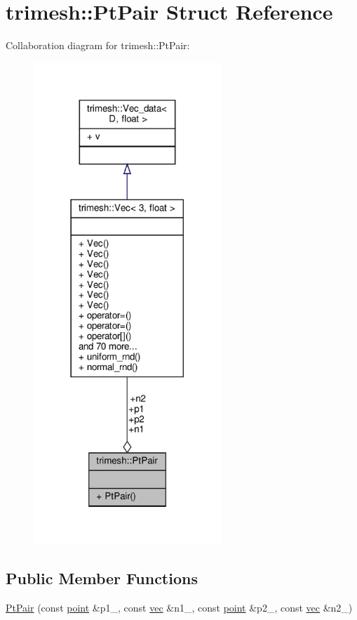 \hypertarget{structtrimesh_1_1PtPair}{}\section{trimesh\+:\+:Pt\+Pair Struct Reference}
\label{structtrimesh_1_1PtPair}


Collaboration diagram for trimesh\+:\+:Pt\+Pair\+:\nopagebreak
\begin{figure}[H]
\begin{center}
\leavevmode
\includegraphics[width=200pt]{da/d6d/structtrimesh_1_1PtPair__coll__graph}
\end{center}
\end{figure}
\subsection*{Public Member Functions}
\begin{DoxyCompactItemize}
\item 
\hyperlink{structtrimesh_1_1PtPair_aa30b38ab6c70ab6ce20b6a308a124a50}{Pt\+Pair} (const \hyperlink{namespacetrimesh_a325b99fd6454b22fa4c4bc3223271b2c}{point} \&p1\+\_\+, const \hyperlink{namespacetrimesh_a4fc2b83feba99c931f837a0c7d4b4df1}{vec} \&n1\+\_\+, const \hyperlink{namespacetrimesh_a325b99fd6454b22fa4c4bc3223271b2c}{point} \&p2\+\_\+, const \hyperlink{namespacetrimesh_a4fc2b83feba99c931f837a0c7d4b4df1}{vec} \&n2\+\_\+)
\end{DoxyCompactItemize}
